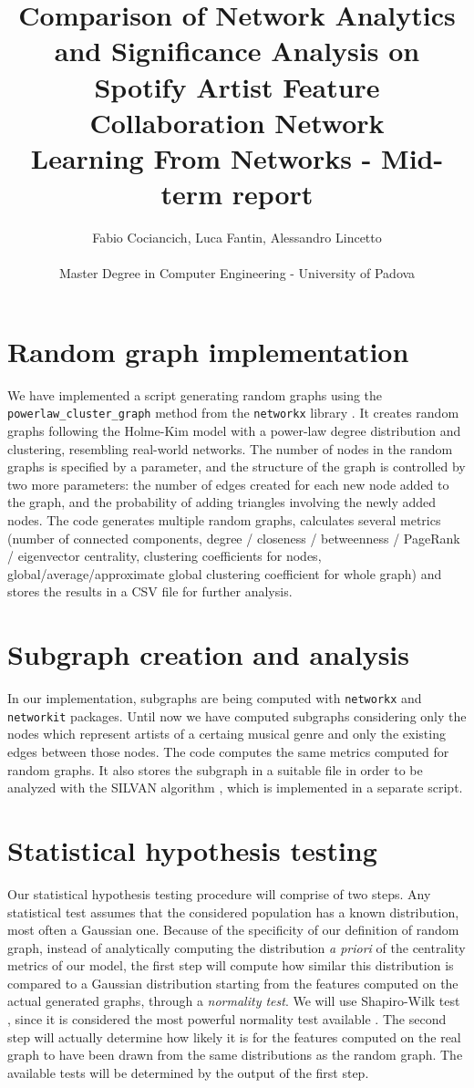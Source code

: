 \documentclass[a4paper, 12pt, conference]{ieeeconf}      %
\title{Comparison of Network Analytics and Significance Analysis on Spotify Artist Feature Collaboration Network\\
\large Learning From Networks - Mid-term report \\}
\author{Fabio Cociancich, Luca Fantin, Alessandro Lincetto %
\\\\ Master Degree in Computer Engineering - University of Padova \\
}
\begin{document}
\maketitle
\thispagestyle{plain}
\pagestyle{plain}

\section{Random graph implementation}
We have implemented a script generating random graphs using the \texttt{powerlaw\_cluster\_graph} method from the \texttt{networkx} library \cite{NetworkX_Graph}. It creates random graphs following the Holme-Kim model \cite{Holme2002} with a power-law degree distribution and clustering, resembling real-world networks. The number of nodes in the random graphs is specified by a parameter, and the structure of the graph is controlled by two more parameters: the number of edges created for each new node added to the graph, and the probability of adding triangles involving the newly added nodes. The code generates multiple random graphs, calculates several metrics (number of connected components, degree / closeness / betweenness / PageRank / eigenvector centrality, clustering coefficients for nodes, global/average/approximate global clustering coefficient for whole graph) and stores the results in a CSV file for further analysis.

\section{Subgraph creation and analysis}
In our implementation, subgraphs are being computed with \texttt{networkx} and \texttt{networkit} packages.
Until now we have computed subgraphs considering only the nodes which represent artists of a certaing musical genre and only the existing edges between those nodes. The code computes the same metrics computed for random graphs. It also stores the subgraph in a suitable file in order to be analyzed with the SILVAN algorithm \cite{SILVAN}, which is implemented in a separate script.

\section{Statistical hypothesis testing}

Our statistical hypothesis testing procedure will comprise of two steps. Any statistical test assumes that the considered population has a known distribution, most often a Gaussian one. Because of the specificity of our definition of random graph, instead of analytically computing the distribution \emph{a priori} of the centrality metrics of our model, the first step will compute how similar this distribution is compared to a Gaussian distribution starting from the features computed on the actual generated graphs, through a \emph{normality test}. We will use Shapiro-Wilk test \cite{ShapiroWilk1965}, since it is considered the most powerful normality test available \cite{RazaliYap2011}. The second step will actually determine how likely it is for the features computed on the real graph to have been drawn from the same distributions as the random graph. The available tests will be determined by the output of the first step.
\end{document}
